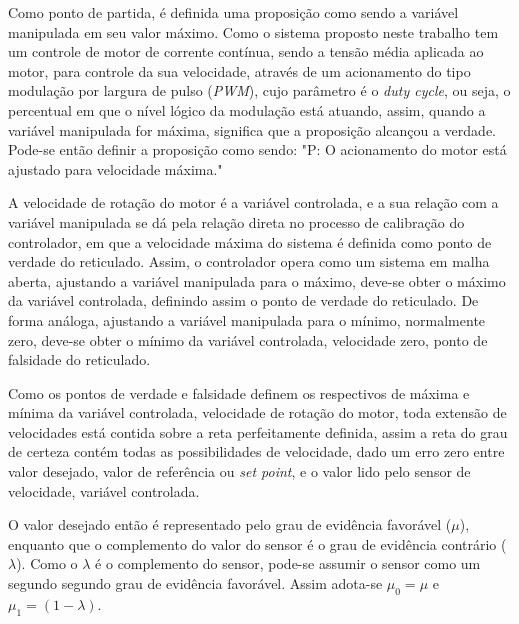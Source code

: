 
Como ponto de partida,
é definida uma proposição como sendo a variável manipulada em seu valor máximo.
Como o sistema proposto neste trabalho tem um controle de motor de corrente contínua,
sendo a tensão média aplicada ao motor, para controle da sua velocidade,
através de um acionamento do tipo modulação por largura de pulso (\emph{PWM}),
cujo parâmetro é o \emph{duty cycle}, ou seja, o percentual em que o nível lógico
da modulação está atuando,
assim, quando a variável manipulada for máxima,
significa que a proposição alcançou a verdade.
Pode-se então definir a proposição como sendo:
"P: O acionamento do motor está ajustado para velocidade máxima."

A velocidade de rotação do motor é a variável controlada,
e a sua relação com a variável manipulada se dá pela relação direta
no processo de calibração do controlador,
em que a velocidade máxima do sistema é definida como ponto de verdade do reticulado.
Assim, o controlador opera como um sistema em malha aberta,
ajustando a variável manipulada para o máximo,
deve-se obter o máximo da variável controlada,
definindo assim o ponto de verdade do reticulado.
De forma análoga, ajustando a variável manipulada para o mínimo,
normalmente zero, deve-se obter o mínimo da variável controlada,
velocidade zero, ponto de falsidade do reticulado.

Como os pontos de verdade e falsidade definem os respectivos de
máxima e mínima da variável controlada, velocidade de rotação do motor,
toda extensão de velocidades está contida sobre a reta perfeitamente definida,
assim a reta do grau de certeza contém todas as possibilidades de velocidade,
dado um erro zero entre valor desejado, valor de referência ou \emph{set point},
e o valor lido pelo sensor de velocidade, variável controlada.

O valor desejado então é representado pelo grau de evidência favorável ($\mu$),
enquanto que o complemento do valor do sensor é o grau de evidência contrário ($\lambda$).
Como o $\lambda$ é o complemento do sensor,
pode-se assumir o sensor como um segundo segundo grau de evidência favorável.
Assim adota-se $\mu_0 = \mu$ e $\mu_1 = (1 - \lambda)$.



